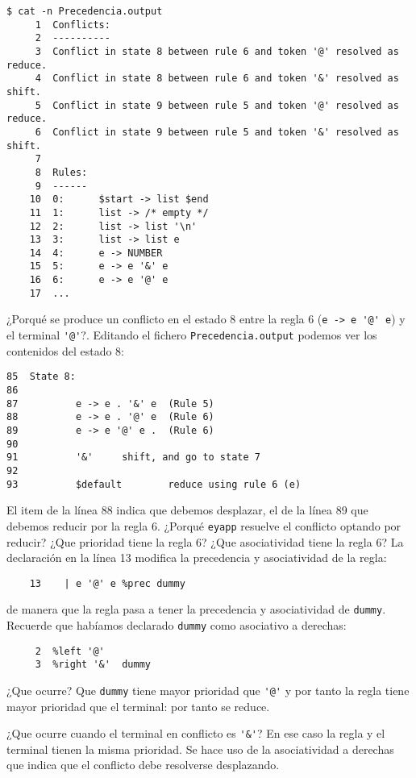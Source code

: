 \begin{verbatim}
$ cat -n Precedencia.output
     1  Conflicts:
     2  ----------
     3  Conflict in state 8 between rule 6 and token '@' resolved as reduce.
     4  Conflict in state 8 between rule 6 and token '&' resolved as shift.
     5  Conflict in state 9 between rule 5 and token '@' resolved as reduce.
     6  Conflict in state 9 between rule 5 and token '&' resolved as shift.
     7
     8  Rules:
     9  ------
    10  0:      $start -> list $end
    11  1:      list -> /* empty */
    12  2:      list -> list '\n'
    13  3:      list -> list e
    14  4:      e -> NUMBER
    15  5:      e -> e '&' e
    16  6:      e -> e '@' e
    17  ...
\end{verbatim}
¿Porqué se produce un conflicto en el estado 8 entre la regla
6 (\verb|e -> e '@' e|) y el terminal \verb|'@'|?. Editando el fichero
\verb|Precedencia.output| podemos ver los contenidos
del estado 8:
\begin{verbatim}
85  State 8:
86
87          e -> e . '&' e  (Rule 5)
88          e -> e . '@' e  (Rule 6)
89          e -> e '@' e .  (Rule 6)
90
91          '&'     shift, and go to state 7
92
93          $default        reduce using rule 6 (e)
\end{verbatim}
El item de la línea 88 indica que debemos desplazar, el de 
la línea 89 que debemos reducir por la regla 6. ¿Porqué \verb|eyapp|
resuelve el conflicto optando por reducir?
¿Que prioridad tiene la regla 6?
¿Que asociatividad tiene la regla 6?
La declaración en la línea 13 modifica la precedencia y asociatividad
de la regla:

\begin{verbatim}
    13    | e '@' e %prec dummy
\end{verbatim}

de manera que la regla pasa a tener la precedencia y asociatividad
de \verb|dummy|. Recuerde que habíamos declarado \verb|dummy| como
asociativo a derechas:
\begin{verbatim}
     2  %left '@'
     3  %right '&'  dummy
\end{verbatim}
¿Que ocurre? Que \verb|dummy| tiene mayor prioridad
que \verb|'@'| y por tanto la regla tiene mayor prioridad
que el terminal: por tanto se reduce.

¿Que ocurre cuando el terminal en conflicto es \verb|'&'|?
En ese caso la regla y el terminal tienen la misma prioridad.
Se hace uso de la asociatividad a derechas que indica que el conflicto
debe resolverse desplazando.

